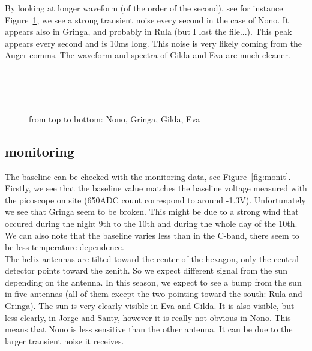 By looking  at longer waveform (of  the order of the  second), see for
instance  Figure~\ref{fig:longwf},  we see  a  strong transient  noise
every second  in the  case of  Nono.  It appears  also in  Gringa, and
probably in  Rula (but I lost  the file...).  This  peak appears every
second and  is 10ms long.  This  noise is very likely  coming from the
Auger  comms.  The  waveform and  spectra of  Gilda and  Eva  are much
cleaner.
\begin{figure}[ht!]
  \centering
  \hspace*{-3ex}
  \\
  \\
  \\
  \caption{from top to bottom: Nono, Gringa, Gilda, Eva}
  \label{fig:longwf}
\end{figure}



\clearpage
\subsection{monitoring}
The   baseline  can  be   checked  with   the  monitoring   data,  see
Figure~\ref{fig:monit}.   Firstly,  we  see  that the  baseline  value
matches  the baseline  voltage  measured with  the  picoscope on  site
(650ADC count correspond to  around -1.3V).  Unfortunately we see that
Gringa seem  to be  broken. This might  be due  to a strong  wind that
occured during the  night 9th to the 10th and during  the whole day of
the 10th.   \\We can also note  that the baseline varies  less than in
the C-band, there seem to be less temperature dependence.  \\The helix
antennas are tilted toward the center of the hexagon, only the central
detector points toward the zenith.  So we expect different signal from
the sun depending  on the antenna. In this season, we  expect to see a
bump  from the  sun  in five  antennas  (all of  them  except the  two
pointing toward the  south: Rula and Gringa). The  sun is very clearly
visible in  Eva and Gilda.  It  is also visible, but  less clearly, in
Jorge and Santy, however it is  really not obvious in Nono. This means
that Nono is  less sensitive than the other antenna. It  can be due to
the larger transient noise it receives.

